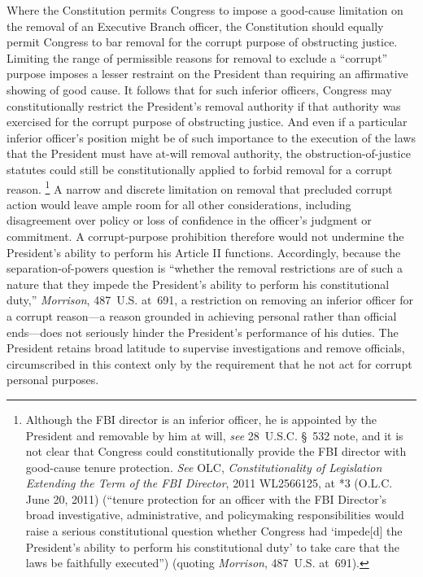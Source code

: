 Where the Constitution permits Congress to impose a good-cause limitation on the removal of an Executive Branch officer, the Constitution should equally permit Congress to bar removal for the corrupt purpose of obstructing justice.
Limiting the range of permissible reasons for removal to exclude a ``corrupt'' purpose imposes a lesser restraint on the President than requiring an affirmative showing of good cause.
It follows that for such inferior officers, Congress may constitutionally restrict the President's removal authority if that authority was exercised for the corrupt purpose of obstructing justice.
And even if a particular inferior officer's position might be of such importance to the execution of the laws that the President must have at-will removal authority, the obstruction-of-justice statutes could still be constitutionally applied to forbid removal for a corrupt reason.%
\footnote{Although the FBI director is an inferior officer, he is appointed by the President and removable by him at will, \textit{see} 28~U.S.C. \S~532 note, and it is not clear that Congress could constitutionally provide the FBI director with good-cause tenure protection.
\textit{See} OLC, \textit{Constitutionality of Legislation Extending the Term of the FBI Director}, 2011 WL2566125, at *3 (O.L.C. June 20, 2011) (``tenure protection for an officer with the FBI Director's broad investigative, administrative, and policymaking responsibilities would raise a serious constitutional question whether Congress had `impede[d] the President's ability to perform his constitutional duty' to take care that the laws be faithfully executed'') (quoting \textit{Morrison}, 487~U.S. at~691).}
A narrow and discrete limitation on removal that precluded corrupt action would leave ample room for all other considerations, including disagreement over policy or loss of confidence in the officer's judgment or commitment.
A corrupt-purpose prohibition therefore would not undermine the President's ability to perform his Article II functions.
Accordingly, because the separation-of-powers question is ``whether the removal restrictions are of such a nature that they impede the President's ability to perform his constitutional duty,'' \textit{Morrison}, 487~U.S. at~691, a restriction on removing an inferior officer for a corrupt reason---a reason grounded in achieving personal rather than official ends---does not seriously hinder the President's performance of his duties.
The President retains broad latitude to supervise investigations and remove officials, circumscribed in this context only by the requirement that he not act for corrupt personal purposes.%
